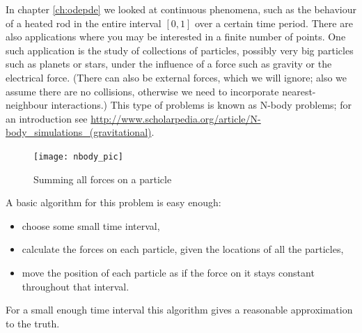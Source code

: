 

In chapter \ref{ch:odepde} we looked at continuous phenomena, such as
the behaviour of a heated rod in the entire interval $[0,1]$ over a
certain time period. There are also applications where you may be
interested in a finite number of points. One such application is the
study of collections of particles, possibly very big particles such as
planets or stars, under the influence of a force such as gravity or
the electrical force. (There can also be external forces, which we
will ignore; also we assume there are no collisions, otherwise we need
to incorporate nearest-neighbour interactions.) This type of problems
is known as N-body problems; for an introduction
see \url{http://www.scholarpedia.org/article/N-body_simulations_(gravitational)}.

\begin{figure}
\texttt{[image: nbody\_pic]}
\caption{Summing all forces on a particle}
\hbox{}\kern-1.5in\hbox{}
\end{figure}
%
A basic algorithm for this problem is easy enough:
\begin{itemize}
\item choose some small time interval,
\item calculate the forces on each particle, given the locations of
  all the particles,
\item move the position of each particle as if the force on it stays
  constant throughout that interval.
\end{itemize}
For a small enough time interval this algorithm gives a reasonable approximation to the truth. 


